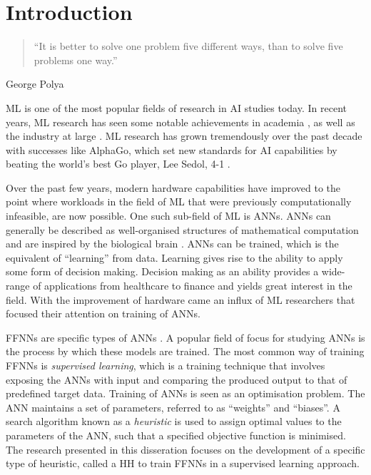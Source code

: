 \chapter{Introduction}\label{chap:introduction}

\begin{quotation}
      \noindent ``It is better to solve one problem five different ways, than to solve five problems one way.''
\end{quotation}
\begin{flushright}
      George Polya
\end{flushright}

\noindent
\Ac{ML} is one of the most popular fields of research in \ac{AI} studies today. In recent years, \ac{ML} research has seen some notable achievements in academia \cite{ref:lecun:2015, ref:glorot:2010, ref:goodfellow:2014, ref:quoc:2017}, as well as the industry at large \cite{ref:silver:2016, ref:silver:2017, ref:zoph:2017, ref:lewis:2017}.  \ac{ML} research has grown tremendously over the past decade with successes like AlphaGo, which set new standards for \ac{AI} capabilities by beating the world's best Go player, Lee Sedol, 4-1 \cite{ref:san-hun:2016}.

Over the past few years, modern hardware capabilities have improved to the point where workloads in the field of \ac{ML} that were previously computationally infeasible, are now possible. One such sub-field of \ac{ML} is \acp{ANN}. \acp{ANN} can generally be described as well-organised structures of mathematical computation and are inspired by the biological brain \cite{ref:engelbrecht:2007}. \acp{ANN} can be trained, which is the equivalent of ``learning'' from data. Learning gives rise to the ability to apply some form of decision making. Decision making as an ability provides a wide-range of applications from healthcare to finance and yields great interest in the field. With the improvement of hardware came an influx of \ac{ML} researchers that focused their attention on training of \acp{ANN}.

\Acfp{FFNN} are specific types of \acp{ANN} \cite{ref:reed:1999}. A popular field of focus for studying \acp{ANN} is the process by which these models are trained.  The most common way of training \acp{FFNN} is \textit{supervised learning}, which is a training technique that involves exposing the \acp{ANN} with input and comparing the produced output to that of predefined target data. Training of \acp{ANN} is seen as an optimisation problem. The \ac{ANN} maintains a set of parameters, referred to as ``weights'' and ``biases''. A search algorithm known as a \textit{heuristic} \cite{ref:pearl:1984} is used to assign optimal values to the parameters of the \ac{ANN}, such that a specified objective function is minimised. The research presented in this disseration focuses on the development of a specific type of heuristic, called a \acf{HH} to train \acp{FFNN} in a supervised learning approach.

